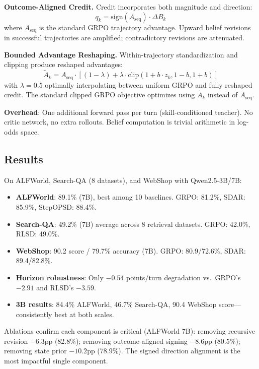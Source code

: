 \documentclass[11pt,a4paper]{article}
\begin{document}
\textbf{Outcome-Aligned Credit.} Credit incorporates both magnitude and direction:
\begin{equation}
    q_k = \text{sign}(A_{\text{seq}}) \cdot \Delta B_k
\end{equation}
where $A_{\text{seq}}$ is the standard GRPO trajectory advantage. Upward belief revisions in successful trajectories are amplified; contradictory revisions are attenuated.

\textbf{Bounded Advantage Reshaping.} Within-trajectory standardization and clipping produce reshaped advantages:
\begin{equation}
    \tilde{A}_k = A_{\text{seq}} \cdot [(1-\lambda) + \lambda \cdot \text{clip}(1 + b \cdot z_k, 1-b, 1+b)]
\end{equation}
with $\lambda = 0.5$ optimally interpolating between uniform GRPO and fully reshaped credit. The standard clipped GRPO objective optimizes using $\tilde{A}_k$ instead of $A_{\text{seq}}$.

\textbf{Overhead}: One additional forward pass per turn (skill-conditioned teacher). No critic network, no extra rollouts. Belief computation is trivial arithmetic in log-odds space.

\subsection{Results}
On ALFWorld, Search-QA (8 datasets), and WebShop with Qwen2.5-3B/7B:
\begin{itemize}
    \item \textbf{ALFWorld}: 89.1\% (7B), best among 10 baselines. GRPO: 81.2\%, SDAR: 85.9\%, StepOPSD: 88.4\%.
    \item \textbf{Search-QA}: 49.2\% (7B) average across 8 retrieval datasets. GRPO: 42.0\%, RLSD: 49.0\%.
    \item \textbf{WebShop}: 90.2 score / 79.7\% accuracy (7B). GRPO: 80.9/72.6\%, SDAR: 89.4/82.8\%.
    \item \textbf{Horizon robustness}: Only $-0.54$ points/turn degradation vs.\ GRPO's $-2.91$ and RLSD's $-3.59$.
    \item \textbf{3B results}: 84.4\% ALFWorld, 46.7\% Search-QA, 90.4 WebShop score---consistently best at both scales.
\end{itemize}

Ablations confirm each component is critical (ALFWorld 7B): removing recursive revision $-6.3$pp (82.8\%); removing outcome-aligned signing $-8.6$pp (80.5\%); removing state prior $-10.2$pp (78.9\%). The signed direction alignment is the most impactful single component.
\end{document}
